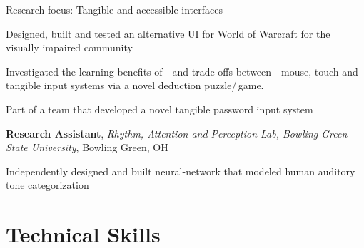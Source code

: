 \documentclass[10pt, letter]{article}
\newcommand{\years}[1]{\marginnote{\footnotesize #1}}
\newenvironment{desc*}{
  \begin{description}
    \setlength{\itemsep}{0.2pt}
    \setlength{\parskip}{-1pt}
    \setlength{\parsep}{0pt}
  }{
  \end{description}
}
\begin{document}
Research focus: Tangible and accessible interfaces %
\begin{itemize}[leftmargin=*, parsep=1pt, rightmargin=1.5cm]
  {\light
\item Designed, built and tested an alternative UI for World of Warcraft for
  the visually impaired community
\item Investigated the learning benefits of---and trade-offs between---mouse,
  touch and tangible input systems via a novel deduction puzzle/\,game.
\item Part of a team that developed a novel tangible password input system
  }
\end{itemize}
\bigskip
\years{2008 - 2010} 
\textbf{Research Assistant},
\textit{Rhythm, Attention and Perception Lab, Bowling Green State
  University}, Bowling Green, OH\\ 
\vspace{-.3cm}
\begin{itemize}[leftmargin=*, parsep=1pt, rightmargin=1.5cm]
  {\light
\item Independently designed and built neural-network that
  modeled human auditory tone categorization
  }
\end{itemize}

\newpage
\section*{Technical Skills}
\end{document}
